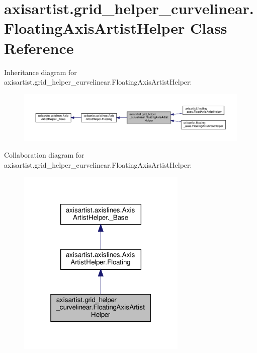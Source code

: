 \hypertarget{classaxisartist_1_1grid__helper__curvelinear_1_1FloatingAxisArtistHelper}{}\section{axisartist.\+grid\+\_\+helper\+\_\+curvelinear.\+Floating\+Axis\+Artist\+Helper Class Reference}
\label{classaxisartist_1_1grid__helper__curvelinear_1_1FloatingAxisArtistHelper}


Inheritance diagram for axisartist.\+grid\+\_\+helper\+\_\+curvelinear.\+Floating\+Axis\+Artist\+Helper\+:
\nopagebreak
\begin{figure}[H]
\begin{center}
\leavevmode
\includegraphics[width=350pt]{classaxisartist_1_1grid__helper__curvelinear_1_1FloatingAxisArtistHelper__inherit__graph}
\end{center}
\end{figure}


Collaboration diagram for axisartist.\+grid\+\_\+helper\+\_\+curvelinear.\+Floating\+Axis\+Artist\+Helper\+:
\nopagebreak
\begin{figure}[H]
\begin{center}
\leavevmode
\includegraphics[width=229pt]{classaxisartist_1_1grid__helper__curvelinear_1_1FloatingAxisArtistHelper__coll__graph}
\end{center}
\end{figure}
